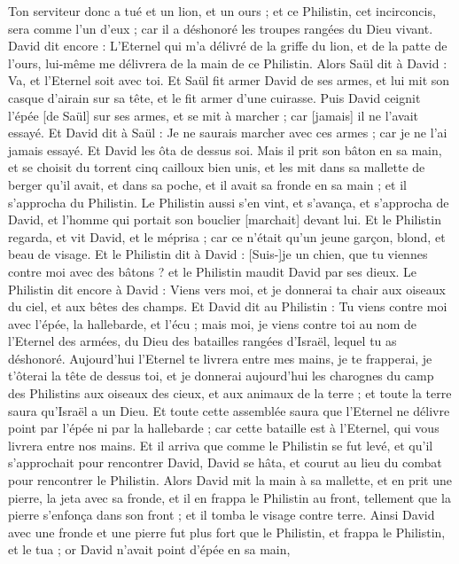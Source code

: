 \begin{multicols}{2}
Ton serviteur donc a tué et un lion, et un ours ; et ce Philistin, cet incirconcis, sera comme l'un d'eux ; car il a déshonoré les troupes rangées du Dieu vivant.
David dit encore : L'Eternel qui m'a délivré de la griffe du lion, et de la patte de l'ours, lui-même me délivrera de la main de ce Philistin. Alors Saül dit à David : Va, et l'Eternel soit avec toi.
Et Saül fit armer David de ses armes, et lui mit son casque d'airain sur sa tête, et le fit armer d'une cuirasse.
Puis David ceignit l'épée [de Saül] sur ses armes, et se mit à marcher ; car [jamais] il ne l'avait essayé. Et David dit à Saül : Je ne saurais marcher avec ces armes ; car je ne l'ai jamais essayé. Et David les ôta de dessus soi.
Mais il prit son bâton en sa main, et se choisit du torrent cinq cailloux bien unis, et les mit dans sa mallette de berger qu'il avait, et dans sa poche, et il avait sa fronde en sa main ; et il s'approcha du Philistin.
Le Philistin aussi s'en vint, et s'avança, et s'approcha de David, et l'homme qui portait son bouclier [marchait] devant lui.
Et le Philistin regarda, et vit David, et le méprisa ; car ce n'était qu'un jeune garçon, blond, et beau de visage.
Et le Philistin dit à David : [Suis-]je un chien, que tu viennes contre moi avec des bâtons ? et le Philistin maudit David par ses dieux.
Le Philistin dit encore à David : Viens vers moi, et je donnerai ta chair aux oiseaux du ciel, et aux bêtes des champs.
Et David dit au Philistin : Tu viens contre moi avec l'épée, la hallebarde, et l'écu ; mais moi, je viens contre toi au nom de l'Eternel des armées, du Dieu des batailles rangées d'Israël, lequel tu as déshonoré.
Aujourd'hui l'Eternel te livrera entre mes mains, je te frapperai, je t'ôterai la tête de dessus toi, et je donnerai aujourd'hui les charognes du camp des Philistins aux oiseaux des cieux, et aux animaux de la terre ; et toute la terre saura qu'Israël a un Dieu.
Et toute cette assemblée saura que l'Eternel ne délivre point par l'épée ni par la hallebarde ; car cette bataille est à l'Eternel, qui vous livrera entre nos mains.
Et il arriva que comme le Philistin se fut levé, et qu'il s'approchait pour rencontrer David, David se hâta, et courut au lieu du combat pour rencontrer le Philistin.
Alors David mit la main à sa mallette, et en prit une pierre, la jeta avec sa fronde, et il en frappa le Philistin au front, tellement que la pierre s'enfonça dans son front ; et il tomba le visage contre terre.
Ainsi David avec une fronde et une pierre fut plus fort que le Philistin, et frappa le Philistin, et le tua ; or David n'avait point d'épée en sa main,

\end{multicols}
